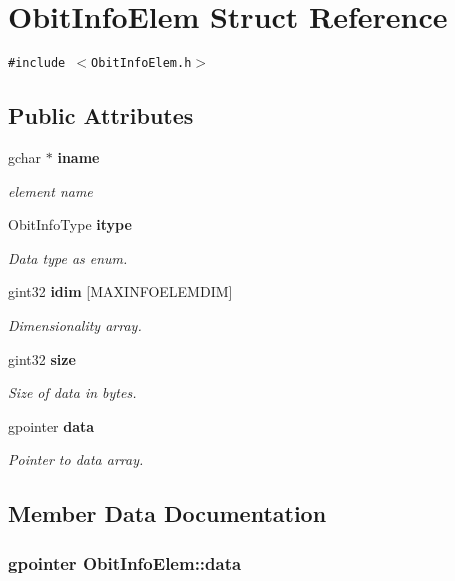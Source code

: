 \section{Obit\-Info\-Elem Struct Reference}
\label{structObitInfoElem}
{\tt \#include $<$Obit\-Info\-Elem.h$>$}

\subsection*{Public Attributes}
\begin{CompactItemize}
\item 
gchar $\ast$ {\bf iname}
\begin{CompactList}\small\item\em element name \item\end{CompactList}\item 
Obit\-Info\-Type {\bf itype}
\begin{CompactList}\small\item\em Data type as enum. \item\end{CompactList}\item 
gint32 {\bf idim} [MAXINFOELEMDIM]
\begin{CompactList}\small\item\em Dimensionality array. \item\end{CompactList}\item 
gint32 {\bf size}
\begin{CompactList}\small\item\em Size of data in bytes. \item\end{CompactList}\item 
gpointer {\bf data}
\begin{CompactList}\small\item\em Pointer to data array. \item\end{CompactList}\end{CompactItemize}


\subsection{Member Data Documentation}
\subsubsection{\setlength{\rightskip}{0pt plus 5cm}gpointer {\bf Obit\-Info\-Elem::data}}\label{structObitInfoElem_o4}


